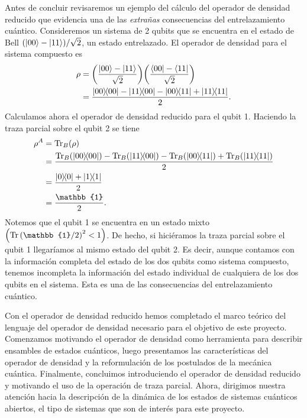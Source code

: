 Antes de concluir revisaremos un ejemplo del cálculo del 
operador de densidad reducido que evidencia una de las
\textit{extrañas} consecuencias del
entrelazamiento cuántico.
Consideremos un sistema de 2 qubits que se encuentra en el estado de Bell
$\qty(\ket{00}-\ket{11})/\sqrt{2}$, un estado entrelazado. El operador
de densidad para el sistema compuesto es
\begin{align}
	\rho &= \qty(\frac{\ket{00}-\ket{11}}{\sqrt{2}})
	\qty(\frac{\bra{00}-\bra{11}}{\sqrt{2}}) \\
			 &= \frac{\dyad{00}{00}-\dyad{11}{00}-\dyad{00}{11}+\dyad{11}{11}}{2}.
\end{align}
Calculamos ahora el operador de densidad reducido para el qubit 1.  
Haciendo la traza parcial sobre el qubit 2 se tiene
\begin{align}
	\rho^A &= \Tr _B(\rho) \\
			 	 &= \frac{\Tr _B(\dyad{00}{00})-\Tr _B(\dyad{11}{00})
			 	 -\Tr _B(\dyad{00}{11})+\Tr _B(\dyad{11}{11})}{2} \\
			 	 &= \frac{\dyad{0}{0} + \dyad{1}{1}}{2} \\
			 	 &= \frac{\mathbb{1}}{2}.
\end{align}
Notemos que el qubit 1 se encuentra en un estado mixto
$\qty(\Tr \qty(\mathbb{1}/2)^2<1)$. De hecho, si hiciéramos la 
traza parcial sobre el qubit 1 llegaríamos al mismo estado del qubit 2.
Es decir, aunque contamos con la información completa del estado 
de los dos qubits como sistema compuesto, tenemos incompleta la 
información del estado individual de cualquiera de los dos qubits
en el sistema. Esta es una de las consecuencias del entrelazamiento
cuántico.

Con el operador de densidad reducido hemos completado
el marco teórico del lenguaje del operador de densidad necesario
para el objetivo de este proyecto. Comenzamos
motivando el operador de densidad como herramienta 
para describir ensambles de
estados cuánticos, luego presentamos las características
del operador de densidad y la reformulación de los postulados 
de la mecánica cuántica.
Finalmente, concluimos introduciendo el operador de densidad reducido y
motivando el uso de la operación de traza parcial. Ahora, dirigimos
nuestra atención hacia la descripción de la dinámica de los estados
de sistemas cuánticos abiertos, el tipo de sistemas que son de interés
para este proyecto.


